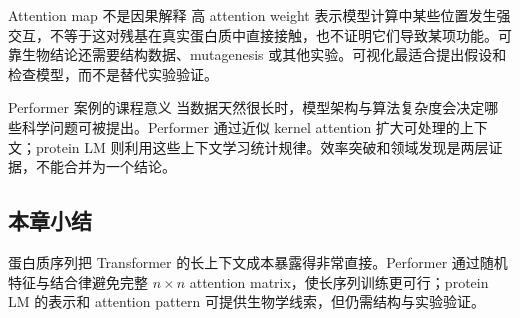 
\begin{warningbox}{Attention map 不是因果解释}
高 attention weight 表示模型计算中某些位置发生强交互，不等于这对残基在真实蛋白质中直接接触，也不证明它们导致某项功能。可靠生物结论还需要结构数据、mutagenesis 或其他实验。可视化最适合提出假设和检查模型，而不是替代实验验证。
\end{warningbox}

\begin{importantbox}{Performer 案例的课程意义}
当数据天然很长时，模型架构与算法复杂度会决定哪些科学问题可被提出。Performer 通过近似 kernel attention 扩大可处理的上下文；protein LM 则利用这些上下文学习统计规律。效率突破和领域发现是两层证据，不能合并为一个结论。
\end{importantbox}

\subsection{本章小结}

蛋白质序列把 Transformer 的长上下文成本暴露得非常直接。Performer 通过随机特征与结合律避免完整 $n\times n$ attention matrix，使长序列训练更可行；protein LM 的表示和 attention pattern 可提供生物学线索，但仍需结构与实验验证。

